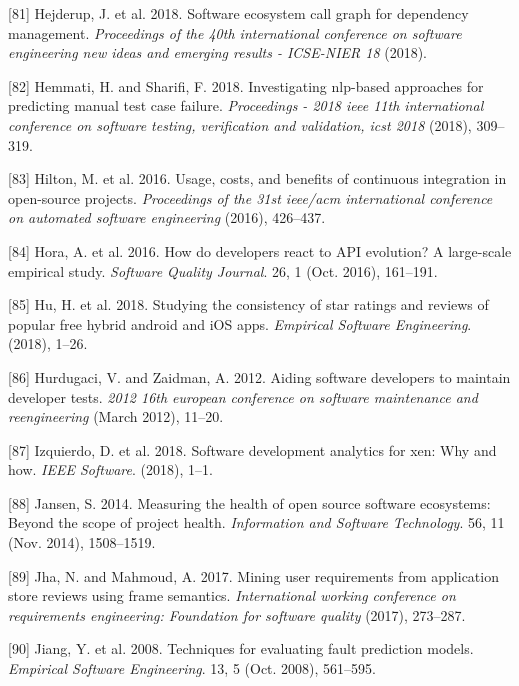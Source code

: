 \documentclass[]{book}
\begin{document}
\hypertarget{ref-Hejderup2018}{}
{[}81{]} Hejderup, J. et al. 2018. Software ecosystem call graph for
dependency management. \emph{Proceedings of the 40th international
conference on software engineering new ideas and emerging results -
ICSE-NIER 18} (2018).

\hypertarget{ref-hemmati2018}{}
{[}82{]} Hemmati, H. and Sharifi, F. 2018. Investigating nlp-based
approaches for predicting manual test case failure. \emph{Proceedings -
2018 ieee 11th international conference on software testing,
verification and validation, icst 2018} (2018), 309--319.

\hypertarget{ref-hilton2016usage}{}
{[}83{]} Hilton, M. et al. 2016. Usage, costs, and benefits of
continuous integration in open-source projects. \emph{Proceedings of the
31st ieee/acm international conference on automated software
engineering} (2016), 426--437.

\hypertarget{ref-Hora2016}{}
{[}84{]} Hora, A. et al. 2016. How do developers react to API evolution?
A large-scale empirical study. \emph{Software Quality Journal}. 26, 1
(Oct. 2016), 161--191.

\hypertarget{ref-hu2018studying}{}
{[}85{]} Hu, H. et al. 2018. Studying the consistency of star ratings
and reviews of popular free hybrid android and iOS apps. \emph{Empirical
Software Engineering}. (2018), 1--26.

\hypertarget{ref-hurdugaci2012}{}
{[}86{]} Hurdugaci, V. and Zaidman, A. 2012. Aiding software developers
to maintain developer tests. \emph{2012 16th european conference on
software maintenance and reengineering} (March 2012), 11--20.

\hypertarget{ref-Izquierdo2018}{}
{[}87{]} Izquierdo, D. et al. 2018. Software development analytics for
xen: Why and how. \emph{IEEE Software}. (2018), 1--1.

\hypertarget{ref-Jansen2014}{}
{[}88{]} Jansen, S. 2014. Measuring the health of open source software
ecosystems: Beyond the scope of project health. \emph{Information and
Software Technology}. 56, 11 (Nov. 2014), 1508--1519.

\hypertarget{ref-jha2017mining}{}
{[}89{]} Jha, N. and Mahmoud, A. 2017. Mining user requirements from
application store reviews using frame semantics. \emph{International
working conference on requirements engineering: Foundation for software
quality} (2017), 273--287.

\hypertarget{ref-Jiang2008}{}
{[}90{]} Jiang, Y. et al. 2008. Techniques for evaluating fault
prediction models. \emph{Empirical Software Engineering}. 13, 5 (Oct.
2008), 561--595.
\end{document}
